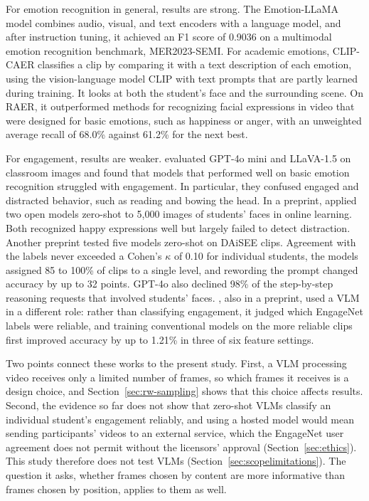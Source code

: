 For emotion recognition in general, results are strong. The Emotion-LLaMA model \cite{cheng2024} combines audio, visual, and text encoders with a language model, and after instruction tuning, it achieved an F1 score of 0.9036 on a multimodal emotion recognition benchmark, MER2023-SEMI. For academic emotions, CLIP-CAER \cite{zhao2025} classifies a clip by comparing it with a text description of each emotion, using the vision-language model CLIP with text prompts that are partly learned during training. It looks at both the student's face and the surrounding scene. On RAER, it outperformed methods for recognizing facial expressions in video that were designed for basic emotions, such as happiness or anger, with an unweighted average recall of 68.0\% against 61.2\% for the next best.

For engagement, results are weaker.  evaluated GPT-4o mini and LLaVA-1.5 on classroom images and found that models that performed well on basic emotion recognition struggled with engagement. In particular, they confused engaged and distracted behavior, such as reading and bowing the head. In a preprint,  applied two open models zero-shot to 5,000 images of students' faces in online learning. Both recognized happy expressions well but largely failed to detect distraction. Another preprint \cite{goyal2026} tested five models zero-shot on DAiSEE clips. Agreement with the labels never exceeded a Cohen's $\kappa$ of 0.10 for individual students, the models assigned 85 to 100\% of clips to a single level, and rewording the prompt changed accuracy by up to 32 points. GPT-4o also declined 98\% of the step-by-step reasoning requests that involved students' faces. , also in a preprint, used a VLM in a different role: rather than classifying engagement, it judged which EngageNet labels were reliable, and training conventional models on the more reliable clips first improved accuracy by up to 1.21\% in three of six feature settings.

Two points connect these works to the present study. First, a VLM processing video receives only a limited number of frames, so which frames it receives is a design choice, and Section~\ref{sec:rw-sampling} shows that this choice affects results. Second, the evidence so far does not show that zero-shot VLMs classify an individual student's engagement reliably, and using a hosted model would mean sending participants' videos to an external service, which the EngageNet user agreement does not permit without the licensors' approval (Section~\ref{sec:ethics}). This study therefore does not test VLMs (Section~\ref{sec:scopelimitations}). The question it asks, whether frames chosen by content are more informative than frames chosen by position, applies to them as well.


